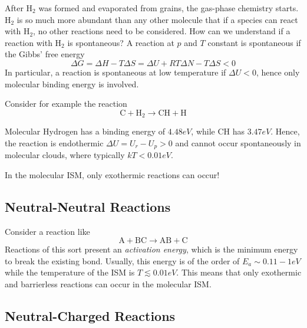 After H$_{2}$ was formed and evaporated from grains, the gas-phase chemistry starts. H$_{2}$ is so much more abundant than any other molecule that if a species can react with H$_{2}$, no other reactions need to be considered. How can we understand if a reaction with H$_{2}$ is spontaneous? A reaction at $p$ and $T$ constant is spontaneous if the Gibbs' free energy
\begin{equation}
    \Delta G = \Delta H -T\Delta S = \Delta U +RT\Delta N -T\Delta S < 0
    \label{eq:gibbsspontaneous}
\end{equation}
In particular, a reaction is spontaneous at low temperature if $\Delta U < 0$, hence only molecular binding energy is involved.
\par Consider for example the reaction 
\begin{equation*}
    \text{C} + \text{H}_{2} \to \text{CH} + \text{H}
\end{equation*}
\par Molecular Hydrogen has a binding energy of $4.48\unit{eV}$, while CH has $3.47\unit{eV}$. Hence, the reaction is endothermic $\Delta U = U_{r} - U_{p} > 0$ and cannot occur spontaneously in molecular clouds, where typically $kT < 0.01\unit{eV}$.
\par In the molecular ISM, only exothermic reactions can occur!

\subsection{Neutral-Neutral Reactions}

Consider a reaction like 
\begin{equation*}
    \text{A}+\text{BC} \to \text{AB}+\text{C}
\end{equation*}
Reactions of this sort present an \emph{activation energy}, which is the minimum energy to break the existing bond. Usually, this energy is of the order of $E_{a}\sim 0.11-1\unit{eV}$ while the temperature of the ISM is $T \lesssim 0.01\unit{eV}$. This means that only exothermic and barrierless reactions can occur in the molecular ISM.

\subsection{Neutral-Charged Reactions}

